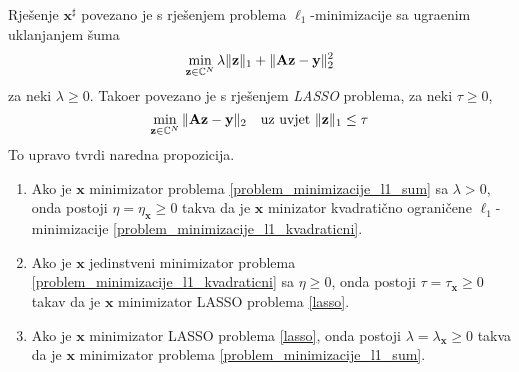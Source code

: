 \documentclass[a4paper,twoside,12pt]{memoir} %
\newcommand{\vect}[1]{\mathbf{#1}}
\renewcommand{\vec}{\vect}
\newcommand{\norm}[1]{\|{#1}\|}
\begin{document}
Rje\v{s}enje $\vec x^{\sharp}$ povezano je s rje\v{s}enjem problema $\ell_1$-minimizacije sa ugra\dj enim uklanjanjem \v{s}uma
\begin{equation}\label{problem_minimizacije_l1_sum}
    \min_{\vec z \in \C^N} \lambda\norm{\vec z}_1 + \norm{\vec{Az}-\vec y}_2^2
\end{equation}
za neki $\lambda \geq 0$. Tako\dj er povezano je s rje\v{s}enjem \textit{LASSO} problema, za neki $\tau \geq 0$,
\begin{equation}\label{lasso}
    \min_{\vec z \in \C^N} \norm{\vec{Az}-\vec y}_2\quad \text{uz uvjet } \norm{\vec z}_1\leq \tau
\end{equation}
To upravo tvrdi naredna propozicija.
\begin{prop}
    \begin{enumerate}[label=(\alph*)]
        \item Ako je $\vec x$ minimizator problema \eqref{problem_minimizacije_l1_sum} sa $\lambda > 0$, onda postoji $\eta = \eta_{\vec x} \geq 0$ takva da je $\vec x$ minizator kvadrati\v{c}no ograni\v{c}ene $\ell_1$-minimizacije \eqref{problem_minimizacije_l1_kvadraticni}.
        \item Ako je $\vec x$ jedinstveni minimizator problema \eqref{problem_minimizacije_l1_kvadraticni} sa $\eta \geq 0$, onda postoji $\tau = \tau_{\vec x} \geq 0$ takav da je $\vec x$ minimizator LASSO problema \eqref{lasso}.
        \item Ako je $\vec x$ minimizator LASSO problema \eqref{lasso}, onda postoji $\lambda = \lambda_{\vec x} \geq  0$ takva da je $\vec x$ minimizator problema \eqref{problem_minimizacije_l1_sum}.
    \end{enumerate}
\end{prop}
\end{document}
